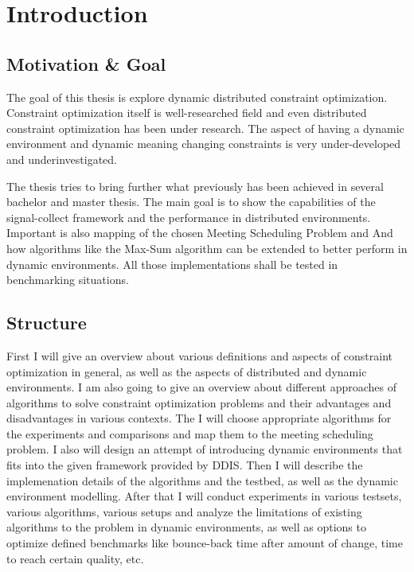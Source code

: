 \chapter{Introduction}

\section{Motivation \& Goal}
The goal of this thesis is explore dynamic distributed constraint optimization. Constraint optimization itself is well-researched field and even distributed constraint optimization has been under research. The aspect of having a dynamic environment and dynamic meaning changing constraints is very under-developed and underinvestigated.\newline

The thesis tries to bring further what previously has been achieved in several bachelor and master thesis. The main goal is to show the capabilities of the signal-collect framework and the performance in distributed environments. Important is also mapping of the chosen Meeting Scheduling Problem and And how algorithms like the Max-Sum algorithm can be extended to better perform in dynamic environments. All those implementations shall be tested in benchmarking situations.\newline

\section{Structure}
First I will give an overview about various definitions and aspects of constraint optimization in general, as well as the aspects of  distributed and dynamic environments. I am also going to give an overview about different approaches of algorithms to solve constraint optimization problems and their advantages and disadvantages in various contexts. The I will choose appropriate algorithms for the experiments and comparisons and map them to the meeting scheduling problem. I also will design an attempt of introducing dynamic environments that fits into the given framework provided by DDIS. Then I will describe the implemenation details of the algorithms and the testbed, as well as the  dynamic environment modelling. After that I will conduct experiments in various testsets, various algorithms, various setups and analyze the limitations of existing algorithms to the problem in dynamic environments, as well as options to optimize defined benchmarks like bounce-back time after amount of change, time to reach certain quality, etc.
